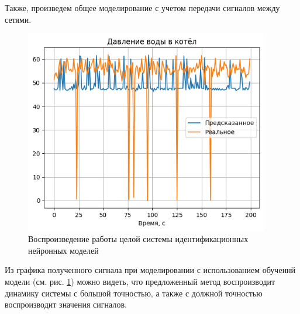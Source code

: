 Также, произведем общее моделирование с учетом передачи сигналов между сетями. 

\begin{figure}[H]
  \begin{center}
    \includegraphics[width=0.95\textwidth]{figures/test/all_res.png}
  \end{center}
  \caption{Воспроизведение работы целой системы идентификационных нейронных моделей}\label{fig:test:plot:system}
\end{figure}

Из графика полученного сигнала при моделировании с использованием обученнй модели (см. рис. \ref{fig:test:plot:system}) можно видеть, что предложенный метод воспроизводит динамику системы с большой точностью, а также с должной точностью воспроизводит значения сигналов.
